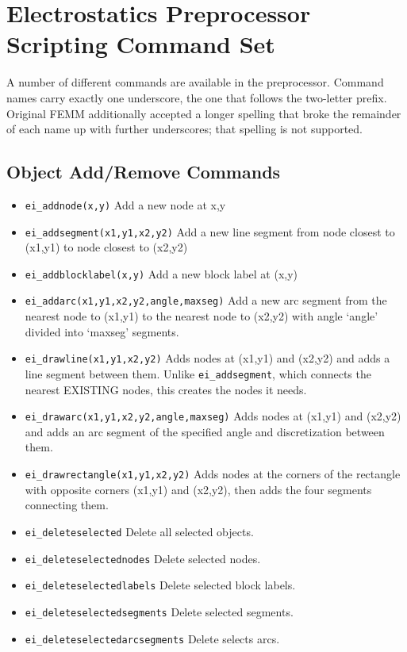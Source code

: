 \section{Electrostatics Preprocessor Scripting Command Set}

A number of different commands are available in the preprocessor.
Command names carry exactly one underscore, the one that follows the
two-letter prefix.  Original FEMM additionally accepted a longer
spelling that broke the remainder of each name up with further
underscores; that spelling is not supported.

\subsection{Object Add/Remove Commands}
\begin{itemize}
\item {\tt ei\_addnode(x,y)} Add a new node at x,y

\item {\tt ei\_addsegment(x1,y1,x2,y2)} Add a new line segment from node closest to
(x1,y1) to node closest to (x2,y2)

\item {\tt ei\_addblocklabel(x,y)} Add a new block label at (x,y)

\item {\tt ei\_addarc(x1,y1,x2,y2,angle,maxseg)} Add a new arc segment from the
nearest node to (x1,y1) to the nearest node to (x2,y2) with angle `angle'
divided into `maxseg' segments.

\item{\tt ei\_drawline(x1,y1,x2,y2)} Adds nodes at (x1,y1) and (x2,y2) and adds a line segment between them. Unlike {\tt ei\_addsegment}, which connects the nearest EXISTING nodes, this creates the nodes it needs.

\item{\tt ei\_drawarc(x1,y1,x2,y2,angle,maxseg)} Adds nodes at (x1,y1) and (x2,y2) and adds an arc segment of the specified angle and discretization between them.

\item{\tt ei\_drawrectangle(x1,y1,x2,y2)} Adds nodes at the corners of the rectangle with opposite corners (x1,y1) and (x2,y2), then adds the four segments connecting them.

\item {\tt ei\_deleteselected} Delete all selected objects.

\item {\tt ei\_deleteselectednodes} Delete selected nodes.

\item {\tt ei\_deleteselectedlabels} Delete selected block labels.

\item {\tt ei\_deleteselectedsegments} Delete selected segments.

\item {\tt ei\_deleteselectedarcsegments} Delete selects arcs.
\end{itemize}


